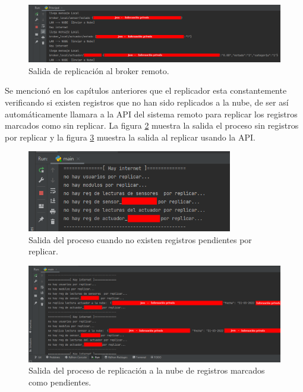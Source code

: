 \begin{figure}[htpb]
\centering 
\includegraphics[width=1.0\textwidth]{./Figures/test/replicador/enviabroker.png}
\caption{Salida de replicación al broker remoto.}
\label{fig:envia2}
\end{figure}

Se mencionó en los capítulos anteriores que el replicador esta constantemente verificando si existen registros que no han sido replicados a la nube, de ser así automáticamente llamara a la API del sistema remoto para replicar los registros marcados como sin replicar. La figura \ref{fig:r1} muestra la salida el proceso sin registros por replicar y la figura \ref{fig:r2} muestra la salida al replicar usando la API. 

\begin{figure}[htpb]
\centering 
\includegraphics[width=0.8\textwidth]{./Figures/test/replicador/sinReplicar1.png}
\caption{Salida del proceso cuando no existen registros pendientes por replicar.}
\label{fig:r1}
\end{figure}

\begin{figure}[htpb]
\centering 
\includegraphics[width=1.0\textwidth]{./Figures/test/replicador/sinReplicar2.png}
\caption{Salida del proceso de replicación a la nube de registros marcados como pendientes.}
\label{fig:r2}
\end{figure}


